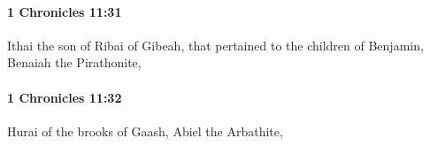 		\paragraph{1 Chronicles 11:31} %
			\label{1CHRONICLES-11-31}

			Ithai the son of Ribai of Gibeah, that pertained to the children of Benjamin, Benaiah the Pirathonite,


		\paragraph{1 Chronicles 11:32} %
			\label{1CHRONICLES-11-32}

			Hurai of the brooks of Gaash, Abiel the Arbathite,


